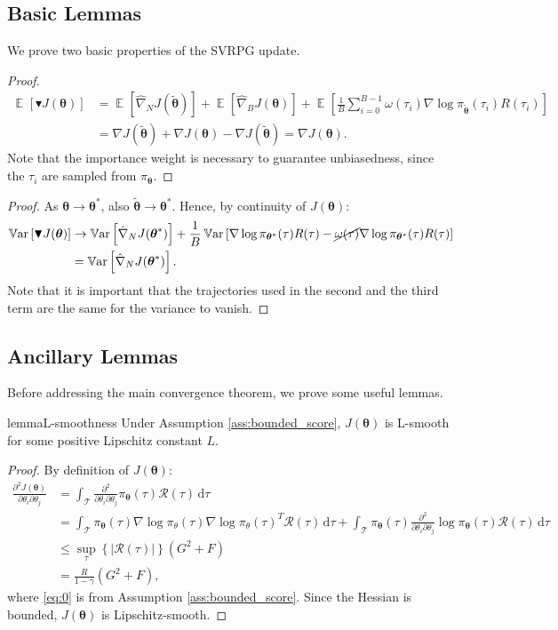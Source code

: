 \documentclass{article}
\theoremstyle{remark}
\theoremstyle{definition}
\DeclareMathOperator*{\EV}{\mathbb{E}}
\DeclareMathOperator*{\Var}{\mathbb{V}ar}
\newcommand{\EVV}[2][\ppvect \in \ppspace]{\EV_{#1}\left[{#2}\right]}
\newcommand{\Dij}[2]{\frac{\partial^{2}{#1}}{\partial{#2}_i\partial{#2}_j}}
\newcommand{\de}{\,\mathrm{d}}
\newcommand{\vtheta}{\boldsymbol{\theta}}
\newcommand{\Tspace}{\mathcal{T}}
\newcommand{\Reward}{\mathcal{R}}
\newcommand{\pol}{\pi_{\vtheta}}
\newcommand{\score}[2]{\nabla\log\pi_{#1}(#2)}
\newcommand{\gradJ}[1]{\nabla J(#1)}
\newcommand{\gradApp}[2]{\hat{\nabla}_{#2}J(#1)}
\newcommand{\gradBlack}[1]{\blacktriangledown J(#1)}
\newcommand{\GRADLOG}{G}
\newcommand{\HESSLOG}{F}
\begin{document}
\subsection*{Basic Lemmas}
We prove two basic properties of the SVRPG update.

\unbias*
\begin{proof}
\begin{align*}
\EVV[]{\gradBlack{\vtheta}} &= \EVV[]{\gradApp{\tilde{\vtheta}}{N}}  + \EVV[]{\gradApp{\vtheta}{B}} + \EVV[]{\frac{1}{B}\sum_{i=0}^{B-1}\omega(\tau_i)\score{\tilde{\vtheta}}{\tau_i}R(\tau_i)} \\
&= \gradJ{\tilde{\vtheta}} + \gradJ{\vtheta} - \gradJ{\tilde{\vtheta}} = \gradJ{\vtheta}.
\end{align*}
Note that the importance weight is necessary to guarantee unbiasedness, since the $\tau_i$ are sampled from $\pi_{\vtheta}$.
\end{proof}

\zerovar*
\begin{proof}
As $\vtheta\to\vtheta^*$, also $\tilde{\vtheta}\to\vtheta^*$. Hence, by continuity of $J(\vtheta)$:
\begin{align*}
\Var\left[\gradBlack{\vtheta}\right] &\to \Var\left[\gradApp{\vtheta^*}{N}\right] + \frac{1}{B}\Var\left[\score{\vtheta^*}{\tau}R(\tau) - \cancel{\omega(\tau)}\score{\vtheta^*}{\tau}R(\tau)\right] \\
&= \Var\left[\gradApp{\vtheta^*}{N}\right].
\end{align*}
Note that it is important that the trajectories used in the second and the third term are the same for the variance to vanish.
\end{proof}

\subsection*{Ancillary Lemmas}
Before addressing the main convergence theorem, we prove some useful lemmas.

 
\begin{restatable}[]{lemma}{L-smoothness}\label{lemma:lsmooth}
	Under Assumption \ref{ass:bounded_score}, $J(\vtheta)$ is L-smooth for some positive Lipschitz constant $L$.
\end{restatable}
\begin{proof}
By definition of $J(\vtheta)$:
\begin{align}
\Dij{J(\vtheta)}{\theta} 
&= \int_{\Tspace}\Dij{}{\theta}\pol(\tau)\Reward(\tau)\de \tau
\nonumber\\ 
&= \int_{\Tspace}\pol(\tau)\score{\theta}{\tau}\score{\theta}{\tau}^T\Reward(\tau)\de \tau + \int_{\Tspace}\pol(\tau)\Dij{}{\theta}\log\pol(\tau)\Reward(\tau)\de \tau \nonumber\\
&\leq \sup_{\tau} \left\{\left|\Reward(\tau)\right|\right\} \left(\GRADLOG^2+\HESSLOG\right) \label{eq:0}\\
&= \frac{R}{1-\gamma}\left(\GRADLOG^2+\HESSLOG\right),\nonumber
\end{align}
where \ref{eq:0} is from Assumption \ref{ass:bounded_score}.
Since the Hessian is bounded, $J(\vtheta)$ is Lipschitz-smooth.
\end{proof}
\end{document}
